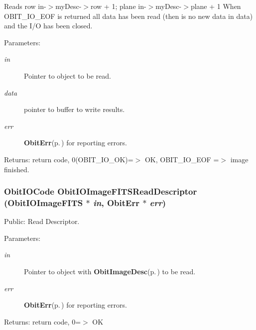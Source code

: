 Reads row in-$>$my\-Desc-$>$row + 1; plane in-$>$my\-Desc-$>$plane + 1 When OBIT\_\-IO\_\-EOF is returned all data has been read (then is no new data in data) and the I/O has been closed. \begin{Desc}
\item[Parameters:]
\begin{description}
\item[{\em in}]Pointer to object to be read. \item[{\em data}]pointer to buffer to write results. \item[{\em err}]{\bf Obit\-Err}{\rm (p.\,\pageref{structObitErr})} for reporting errors. \end{description}
\end{Desc}
\begin{Desc}
\item[Returns:]return code, 0(OBIT\_\-IO\_\-OK)=$>$ OK, OBIT\_\-IO\_\-EOF =$>$ image finished. \end{Desc}
\subsubsection{\setlength{\rightskip}{0pt plus 5cm}Obit\-IOCode Obit\-IOImage\-FITSRead\-Descriptor ({\bf Obit\-IOImage\-FITS} $\ast$ {\em in}, {\bf Obit\-Err} $\ast$ {\em err})}\label{ObitIOImageFITS_8c_a30}


Public: Read Descriptor. 

\begin{Desc}
\item[Parameters:]
\begin{description}
\item[{\em in}]Pointer to object with {\bf Obit\-Image\-Desc}{\rm (p.\,\pageref{structObitImageDesc})} to be read. \item[{\em err}]{\bf Obit\-Err}{\rm (p.\,\pageref{structObitErr})} for reporting errors. \end{description}
\end{Desc}
\begin{Desc}
\item[Returns:]return code, 0=$>$ OK \end{Desc}
